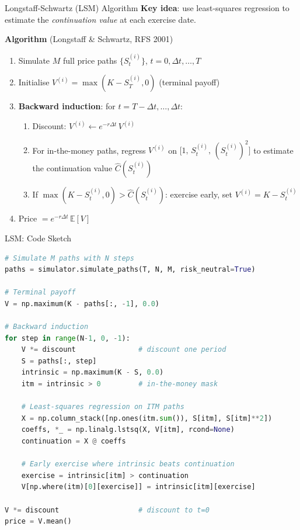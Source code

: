 \documentclass[aspectratio=169,10pt]{beamer}
\newcommand{\E}{\mathbb{E}}
\begin{document}
\begin{frame}{Longstaff-Schwartz (LSM) Algorithm}
  \textbf{Key idea}: use least-squares regression to estimate the
  \emph{continuation value} at each exercise date.

  \bigskip
  \textbf{Algorithm} \small(Longstaff \& Schwartz, RFS 2001)
  \begin{enumerate}
    \item Simulate $M$ full price paths $\{S_t^{(i)}\}$, $t=0,\Delta t,\ldots,T$
    \item Initialise $V^{(i)} = \max(K - S_T^{(i)}, 0)$ (terminal payoff)
    \item \textbf{Backward induction}: for $t = T-\Delta t, \ldots, \Delta t$:
      \begin{enumerate}
        \item Discount: $V^{(i)} \leftarrow e^{-r\Delta t}\,V^{(i)}$
        \item For in-the-money paths, regress $V^{(i)}$ on
              $\bigl[1,\,S_t^{(i)},\,(S_t^{(i)})^2\bigr]$
              to estimate the continuation value $\hat{C}(S_t^{(i)})$
        \item If $\max(K - S_t^{(i)},0) > \hat{C}(S_t^{(i)})$: exercise early,
              set $V^{(i)} = K - S_t^{(i)}$
      \end{enumerate}
    \item Price $= e^{-r\Delta t}\,\E[V]$
  \end{enumerate}
\end{frame}

\begin{frame}[fragile]{LSM: Code Sketch}
\begin{lstlisting}[language=Python]
# Simulate M paths with N steps
paths = simulator.simulate_paths(T, N, M, risk_neutral=True)

# Terminal payoff
V = np.maximum(K - paths[:, -1], 0.0)

# Backward induction
for step in range(N-1, 0, -1):
    V *= discount               # discount one period
    S = paths[:, step]
    intrinsic = np.maximum(K - S, 0.0)
    itm = intrinsic > 0         # in-the-money mask

    # Least-squares regression on ITM paths
    X = np.column_stack([np.ones(itm.sum()), S[itm], S[itm]**2])
    coeffs, *_ = np.linalg.lstsq(X, V[itm], rcond=None)
    continuation = X @ coeffs

    # Early exercise where intrinsic beats continuation
    exercise = intrinsic[itm] > continuation
    V[np.where(itm)[0][exercise]] = intrinsic[itm][exercise]

V *= discount                   # discount to t=0
price = V.mean()
\end{lstlisting}
\end{frame}
\end{document}
